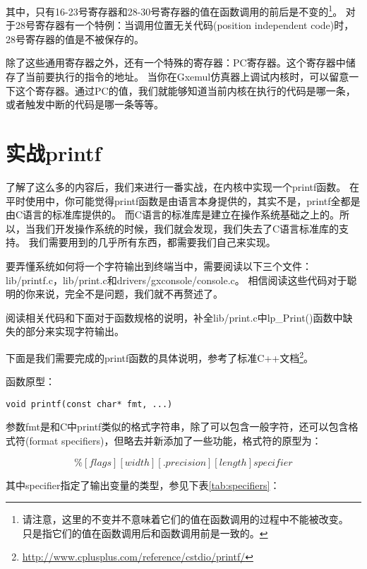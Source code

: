 其中，只有16-23号寄存器和28-30号寄存器的值在函数调用的前后是不变的\footnote{请注意，这里的不变并不意味着它们的值在函数调用的过程中不能被改变。
只是指它们的值在函数调用后和函数调用前是一致的。}。
对于28号寄存器有一个特例：当调用位置无关代码(position independent code)时，28号寄存器的值是不被保存的。

除了这些通用寄存器之外，还有一个特殊的寄存器：PC寄存器。这个寄存器中储存了当前要执行的指令的地址。
当你在Gxemul仿真器上调试内核时，可以留意一下这个寄存器。通过PC的值，我们就能够知道当前内核在执行的代码是哪一条，
或者触发中断的代码是哪一条等等。

\section{实战printf}
了解了这么多的内容后，我们来进行一番实战，在内核中实现一个printf函数。
在平时使用中，你可能觉得printf函数是由语言本身提供的，其实不是，printf全都是由C语言的标准库提供的。
而C语言的标准库是建立在操作系统基础之上的。所以，当我们开发操作系统的时候，我们就会发现，我们失去了C语言标准库的支持。
我们需要用到的几乎所有东西，都需要我们自己来实现。

要弄懂系统如何将一个字符输出到终端当中，需要阅读以下三个文件：lib/printf.c，lib/print.c和drivers/gxconsole/console.c。
相信阅读这些代码对于聪明的你来说，完全不是问题，我们就不再赘述了。

\begin{exercise}
阅读相关代码和下面对于函数规格的说明，补全lib/print.c中lp\_Print()函数中缺失的部分来实现字符输出。
\end{exercise}

下面是我们需要完成的printf函数的具体说明，参考了标准C++文档\footnote{\url{http://www.cplusplus.com/reference/cstdio/printf/}}。

函数原型：
\begin{verbatim}
void printf(const char* fmt, ...)
\end{verbatim}

参数fmt是和C中printf类似的格式字符串，除了可以包含一般字符，还可以包含格式符(format specifiers)，但略去并新添加了一些功能，格式符的原型为：

\begin{equation*}
  \%[flags][width][.precision][length]specifier 
\end{equation*}

其中specifier指定了输出变量的类型，参见下表\ref{tab:specifiers}：

